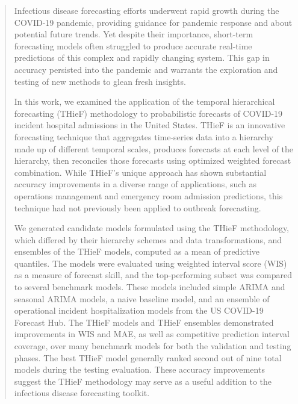 \documentclass[thesis]{umassthesis}  %
\begin{document}
\begin{abstract}                %
Infectious disease forecasting efforts underwent rapid growth during the COVID-19 pandemic, providing guidance for pandemic response and about potential future trends. Yet despite their importance, short-term forecasting models often struggled to produce accurate real-time predictions of this complex and rapidly changing system. This gap in accuracy persisted into the pandemic and warrants the exploration and testing of new methods to glean fresh insights.

In this work, we examined the application of the temporal hierarchical forecasting (THieF) methodology to probabilistic forecasts of COVID-19 incident hospital admissions in the United States. THieF is an innovative forecasting technique that aggregates time-series data into a hierarchy made up of different temporal scales, produces forecasts at each level of the hierarchy, then reconciles those forecasts using optimized weighted forecast combination. While THieF's unique approach has shown substantial accuracy improvements in a diverse range of applications, such as operations management and emergency room admission predictions, this technique had not previously been applied to outbreak forecasting.

We generated candidate models formulated using the THieF methodology, which differed by their hierarchy schemes and data transformations, and ensembles of the THieF models, computed as a mean of predictive quantiles. The models were evaluated using weighted interval score (WIS) as a measure of forecast skill, and the top-performing subset was compared to several benchmark models. These models included simple ARIMA and seasonal ARIMA models, a naive baseline model, and an ensemble of operational incident hospitalization models from the US COVID-19 Forecast Hub. The THieF models and THieF ensembles demonstrated improvements in WIS and MAE, as well as competitive prediction interval coverage, over many benchmark models for both the validation and testing phases. The best THieF model generally ranked second out of nine total models during the testing evaluation. These accuracy improvements suggest the THieF methodology may serve as a useful addition to the infectious disease forecasting toolkit.
\end{abstract}

\end{document}

